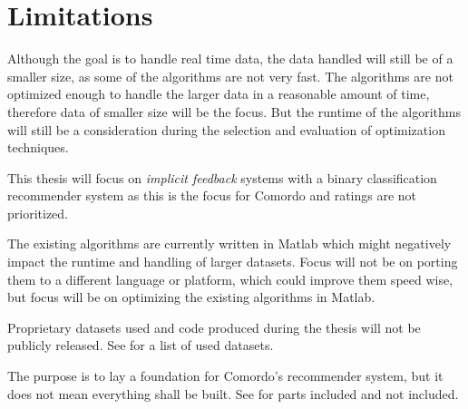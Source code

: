 
\section{Limitations}\label{sec:intro:limitations}


Although the goal is to handle real time data, the data handled will still be of a smaller size, as some of the algorithms are not very fast. The algorithms are not optimized enough to handle the larger data in a reasonable amount of time, therefore data of smaller size will be the focus. But the runtime of the algorithms will still be a consideration during the selection and evaluation of optimization techniques.

This thesis will focus on \textit{implicit feedback} systems with a binary classification recommender system as this is the focus for Comordo and ratings are not prioritized.

The existing algorithms are currently written in Matlab which might negatively impact the runtime and handling of larger datasets. Focus will not be on porting them to a different language or platform, which could improve them speed wise, but focus will be on optimizing the existing algorithms in Matlab.

Proprietary datasets used and code produced during the thesis will not be publicly released. See  for a list of used datasets.

The purpose is to lay a foundation for Comordo's recommender system, but it does not mean everything shall be built. See  for parts included and not included.

